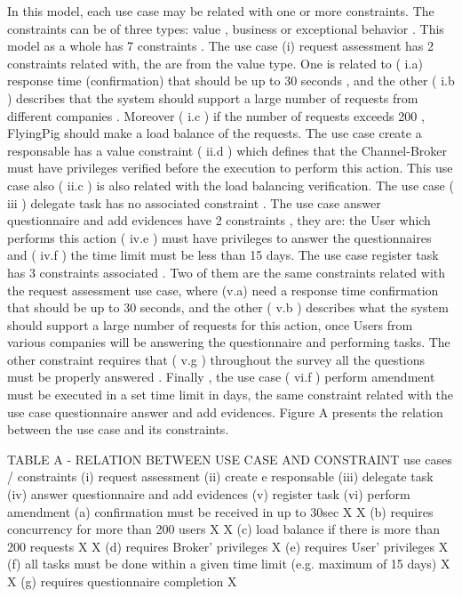 In this model, each use case may be related with one or more constraints. The constraints can be of three types: value , business or exceptional behavior . This model as a whole has 7 constraints . The use case (i) request assessment has 2 constraints related with, the are from the value type. One is related to ( i.a) response time (confirmation) that should be up to 30 seconds , and the other ( i.b ) describes that the system should support a large number of requests from different companies . Moreover ( i.c ) if the number of requests exceeds 200 , FlyingPig should make a load balance of the requests. The use case create a responsable has a value constraint ( ii.d ) which defines that the Channel-Broker must have privileges verified before the execution to perform this action. This use case also ( ii.c ) is also related with the load balancing verification. The use case ( iii ) delegate task has no associated constraint . The use case answer questionnaire and add evidences have 2 constraints , they are: the User which performs this action ( iv.e ) must have privileges to answer the questionnaires and ( iv.f ) the time limit must be less than 15 days. The use case register task has 3 constraints associated . Two of them are the same constraints related with the request assessment use case, where (v.a) need a response time confirmation that should be up to 30 seconds, and the other ( v.b ) describes what the system should support a large number of requests for this action, once Users from various companies will be answering the questionnaire and performing tasks. The other constraint requires that ( v.g ) throughout the survey all the questions must be properly answered . Finally , the use case ( vi.f ) perform amendment must be executed in a set time limit in days, the same constraint related with the use case questionnaire answer and add evidences. Figure A presents the relation between the use case and its constraints.






TABLE A - RELATION BETWEEN USE CASE AND CONSTRAINT
use cases / constraints	(i) request assessment	(ii) create e responsable 	(iii) delegate task	(iv) answer questionnaire and add evidences	(v) register task	(vi) perform amendment
(a) confirmation must be received in up to 30sec	X				X	
(b) requires concurrency for more than 200 users	X				X	
(c) load balance if there is more than 200 requests	X	X				
(d) requires Broker’ privileges		X				
(e) requires User' privileges				X		
(f) all tasks must be done within a given time limit (e.g. maximum of 15 days)				X		X
(g) requires questionnaire completion					X	


